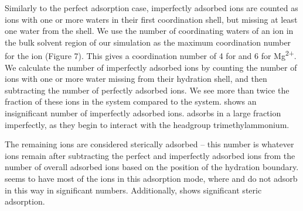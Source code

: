 Similarly to the perfect adsorption case, imperfectly adsorbed ions are counted as ions with one or more waters in their 
first coordination shell, but missing at least one
water from the shell. {We use the number of coordinating waters of an ion in the bulk solvent region
    of our simulation as the maximum coordination number for the ion (Figure 7). This
gives a coordination number of 4 for \li{} and 6 for 
Mg\textsuperscript{2+}.} We calculate 
{the number of imperfectly adsorbed ions} by counting the number of ions with 
one or more water missing from their hydration shell, and then subtracting the number of perfectly adsorbed ions.
We see more than twice the fraction of these ions in the \li{} system compared to the \na system. \mg shows an insignificant
number of imperfectly adsorbed ions. \cl adsorbs in a large fraction imperfectly, as they begin to interact with the headgroup trimethylammonium.

The remaining ions are considered sterically adsorbed -- this number is whatever ions remain after subtracting the 
perfect and imperfectly adsorbed ions from the number of overall adsorbed ions based on the position of the hydration boundary. 
\mg seems to have most of the ions in this adsorption mode, where \na and \li{} do not 
adsorb in this way in significant numbers. Additionally, \cl shows significant steric adsorption.

